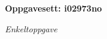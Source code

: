 \centerline{\bf Oppgavesett: i02973no}
\vskip 10pt
\centerline{\it Enkeltoppgave}\vskip 10pt
\vskip 10pt
